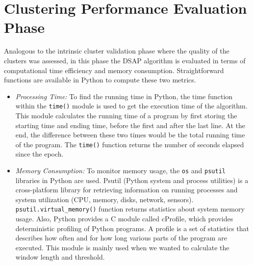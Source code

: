 \section{Clustering Performance Evaluation Phase}
Analogous to the intrinsic cluster validation phase where the quality of the clusters was assessed, in this phase the DSAP algorithm is evaluated in terms of computational time efficiency and memory consumption. Straightforward functions are available in Python to compute these two metrics. 
\begin{itemize}
    \item \textit{Processing Time:} To find the running time in Python, the time function within the \texttt{time()} module is used to get the execution time of the algorithm. This module calculates the running time of a program by first storing the starting time and ending time, before the first and after the last line. At the end, the difference between these two times would be the total running time of the program. The \texttt{time()} function returns the number of seconds elapsed since the epoch.

    \item \textit{Memory Consumption:} To monitor memory usage, the \texttt{os} and \texttt{psutil} libraries in Python are used. Psutil (Python system and process utilities) is a cross-platform library for retrieving information on running processes and system utilization (CPU, memory, disks, network, sensors). \texttt{psutil.virtual\_memory()} function returns statistics about system memory usage. Also, Python provides a C module called cProfile, which provides deterministic profiling of Python programs. A profile is a set of statistics that describes how often and for how long various parts of the program are executed. This module is mainly used when we wanted to calculate the window length and threshold. 



\end{itemize}



